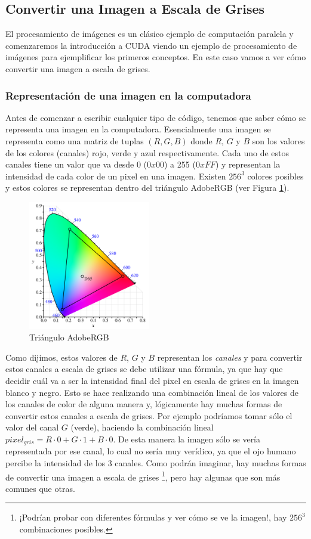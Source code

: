 \subsection{Convertir una Imagen a Escala de Grises}

El procesamiento de imágenes es un clásico ejemplo de computación paralela y comenzaremos la introducción a CUDA viendo
un ejemplo de procesamiento de imágenes para ejemplificar los primeros conceptos. En este caso vamos a ver cómo
convertir una imagen a escala de grises.

\subsubsection{Representación de una imagen en la computadora}

Antes de comenzar a escribir cualquier tipo de código, tenemos que saber cómo se representa una imagen en la
computadora. Esencialmente una imagen se representa como una matriz de tuplas $(R, G, B)$ donde $R$, $G$ y $B$ son los
valores de los colores (canales) rojo, verde y azul respectivamente. Cada uno de estos canales tiene un valor que va
desde 0 ($0x00$) a 255 ($0xFF$) y representan la intensidad de cada color de un pixel en una imagen. Existen $256^3$
colores posibles y estos colores se representan dentro del triángulo AdobeRGB (ver Figura \ref{fig:adobe_rgb}).

\begin{figure}[H]
  \centering
  \includegraphics[width=200px]{./images/adobe_rgb.png}
  \caption{Triángulo AdobeRGB}
  \label{fig:adobe_rgb}
\end{figure}

Como dijimos, estos valores de $R$, $G$ y $B$ representan los \textit{canales} y para convertir estos canales a escala
de grises se debe utilizar una fórmula, ya que hay que decidir cuál va a ser la intensidad final del pixel en escala de
grises en la imagen blanco y negro. Esto se hace realizando una combinación lineal de los valores de los canales de
color de alguna manera y, lógicamente hay muchas formas de convertir estos canales a escala de grises. Por ejemplo
podríamos tomar sólo el valor del canal $G$ (verde), haciendo la combinación lineal $pixel_{gris} = R \cdot 0 + G \cdot
1 + B \cdot 0$. De esta manera la imagen sólo se vería representada por ese canal, lo cual no sería muy verídico,
ya que el ojo humano percibe la intensidad de los 3 canales. Como podrán imaginar, hay muchas formas de convertir una
imagen a escala de grises \footnote{¡Podrían probar con diferentes fórmulas y ver cómo se ve la imagen!, hay $256^3$
combinaciones posibles.}, pero hay algunas que son más comunes que otras.

